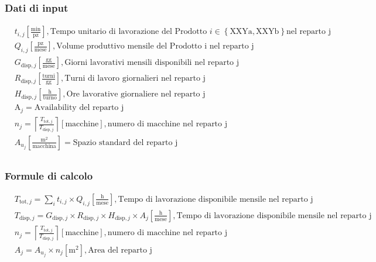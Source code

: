 \documentclass[a4paper,12pt]{article}
\begin{document}
\subsubsection{Dati di input}
\begin{align*}
  &t_{i,j}  \left[\frac{\mathrm{min}}{\mathrm{pz}}\right], \text{Tempo unitario di lavorazione del Prodotto } i\in \left\{ \text{XXYa}, \text{XXYb}\right\} \text{nel reparto j}  \\
  &Q_{i,j} \left[\frac{\mathrm{pz}}{\mathrm{mese}}\right], \text{Volume produttivo mensile del Prodotto i nel reparto j}  \\
  &G_{\text{disp},j} \left[\frac{\mathrm{gg}}{\mathrm{mese}}\right], \text{Giorni lavorativi mensili disponibili nel reparto j} \\
  &R_{\text{disp},j}\left[\frac{\mathrm{turni}}{\mathrm{gg}}\right], \text{Turni di lavoro giornalieri nel reparto j}  \\
  &H_{\text{disp},j}\left[\frac{\mathrm{h}}{\mathrm{turno}}\right], \text{Ore lavorative giornaliere nel reparto j}  \\
  &\text{A}_j = \text{Availability del reparto j} \\
  &n_j = \left\lceil  \frac{T_{\text{tot},j}}{T_{\text{disp},j}}\right\rceil \left[\text{macchine}\right], \text{numero di macchine nel reparto j} \\
  & A_{u_j} \left[\frac{\mathrm{m}^2}{\text{macchina}}\right] = \text{Spazio standard del reparto j}  \\
\end{align*}
\subsubsection{Formule di calcolo}
\begin{align*}
  &T_{\text{tot},j} = \sum_{i} t_{i,j} \times Q_{i,j} \left[\frac{\mathrm{h}}{\mathrm{mese}}\right], \text{Tempo di lavorazione disponibile mensile nel reparto j}  \\
  &T_{\text{disp},j} = G_{\text{disp},j} \times R_{\text{disp},j} \times H_{\text{disp},j} \times A_j  \left[\frac{\mathrm{h}}{\mathrm{mese}}\right], \text{Tempo di lavorazione disponibile mensile nel reparto j} \\
  &n_j = \left\lceil  \frac{T_{\text{tot},j}}{T_{\text{disp},j}}\right\rceil \left[\text{macchine}\right], \text{numero di macchine nel reparto j} \\
  &A_j = A_{u_j} \times n_j \left[\mathrm{m}^2\right], \text{Area del reparto j}  \\
\end{align*}
\end{document}
